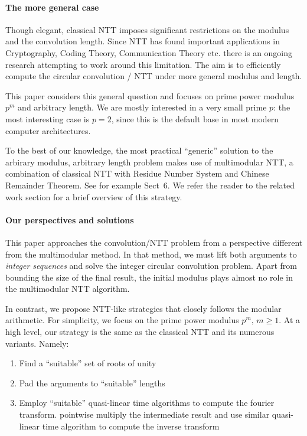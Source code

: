 \paragraph{The more general case}
Though elegant, classical NTT imposes significant restrictions on the modulus and the convolution length. Since NTT has found important applications in Cryptography, Coding Theory, Communication Theory etc. there is an ongoing research attempting to work around this limitation. The aim is to efficiently compute the circular convolution / NTT under more general modulus and length.

This paper considers this general question and focuses on prime power modulus \(p^m\) and arbitrary length. We are mostly interested in a very small prime \(p\): the most interesting case is \(p = 2\), since this is the default base in most modern computer architectures.

To the best of our knowledge, the most practical ``generic'' solution to the arbirary modulus, arbitrary length problem makes use of multimodular NTT, a combination of classical NTT with Residue Number System and Chinese Remainder Theorem. See for example \cite{JSC:Shoup95} Sect~6. We refer the reader to the related work section for a brief overview of this strategy.

\paragraph{Our perspectives and solutions}
This paper approaches the convolution/NTT problem from a perspective different from the multimodular method. In that method, we must lift both arguments to \emph{integer sequences} and solve the integer circular convolution problem. Apart from bounding the size of the final result, the initial modulus plays almost no role in the multimodular NTT algorithm.

In contrast, we propose NTT-like strategies that closely follows the modular arithmetic. For simplicity, we focus on the prime power modulus \(p^m,\, m \ge 1\). At a high level, our strategy is the same as the classical NTT and its numerous variants. Namely:
\begin{enumerate}
    \item Find a ``suitable'' set of roots of unity
    \item Pad the arguments to ``suitable'' lengths
    \item Employ ``suitable'' quasi-linear time algorithms to compute the fourier transform. pointwise multiply the intermediate result and use similar quasi-linear time algorithm to compute the inverse transform
\end{enumerate}

